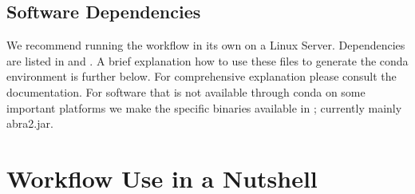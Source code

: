 \documentclass[letterpaper,10pt,english]{sphinxmanual}
\begin{document}
\section{Software Dependencies}
\label{\detokenize{index:software-dependencies}}
We recommend running the workflow in its own  on a Linux Server. Dependencies are listed in  and . A brief explanation how to use these files to generate the conda environment is further below. For comprehensive explanation please consult the  documentation. For software that is not available through conda on some important platforms we make the specific binaries available in ; currently mainly abra2.jar.


\chapter{Workflow Use in a Nutshell}
\label{\detokenize{index:workflow-use-in-a-nutshell}}
\end{document}
